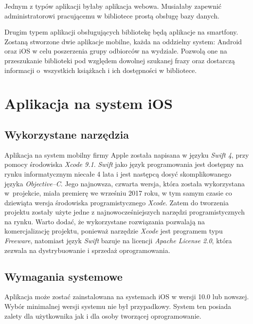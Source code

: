 \documentclass[twoside]{projektInzynierskiMS}
\begin{document}
Jednym z typów aplikacji byłaby aplikacja webowa. Musiałaby zapewnić administratorowi pracującemu w bibliotece prostą obsługę bazy danych.

Drugim typem aplikacji obsługujących bibliotekę będą aplikacje na smartfony. Zostaną stworzone dwie aplikacje mobilne, każda na oddzielny system: Android oraz iOS w celu poszerzenia grupy odbiorców na wydziale. Pozwolą one na przeszukanie biblioteki pod względem dowolnej szukanej frazy oraz dostarczą informacji o~wszystkich książkach i ich dostępności w bibliotece.


\section{Aplikacja na system iOS}

\subsection{Wykorzystane narzędzia}

Aplikacja na system mobilny firmy Apple została napisana w języku \textit{Swift 4}, przy pomocy środowiska \textit{Xcode 9.1}. \textit{Swift} jako język programowania jest dostępny na rynku informatycznym niecałe 4 lata i jest następcą dosyć skomplikowanego języka \textit{Objective--C}. Jego najnowsza, czwarta wersja, która została wykorzystana w~projekcie, miała premierę we wrześniu 2017 roku, w tym samym czasie co dziewiąta wersja środowiska programistycznego \textit{Xcode}. Zatem do tworzenia projektu zostały użyte jedne z najnowocześniejszych narzędzi programistycznych na rynku. Warto dodać, że wykorzystane rozwiązania pozwalają na komercjalizację projektu, ponieważ narzędzie \textit{Xcode} jest programem typu \textit{Freeware}, natomiast język \textit{Swift} bazuje na licencji \textit{Apache License 2.0}, która zezwala na dystrybuowanie i sprzedaż oprogramowania.

\subsection{Wymagania systemowe}

Aplikacja może zostać zainstalowana na systemach iOS w wersji 10.0 lub nowszej. Wybór minimalnej wersji systemu nie był przypadkowy. System ten posiada zalety dla użytkownika jak i dla osoby tworzącej oprogramowanie.
\end{document}

